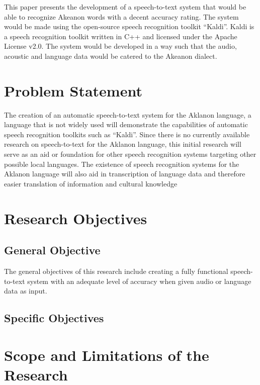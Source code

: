This paper presents the development of a speech-to-text system that would be able to recognize Akeanon words with a decent accuracy rating. The system would be made using the open-source speech recognition toolkit “Kaldi”. Kaldi is a speech recognition toolkit written in C++ and licensed under the Apache License v2.0. The system would be developed in a way such that the audio, acoustic and language data would be catered to the Akeanon dialect.


\section{Problem Statement}

The creation of an automatic speech-to-text system for the Aklanon language, a language that is not widely used will demonstrate the capabilities of automatic speech recognition toolkits such as “Kaldi”.  Since there is no currently available research on speech-to-text for the Aklanon language, this initial research will serve as an aid or foundation for other speech recognition systems targeting other possible local languages. The existence of speech recognition systems for the Aklanon language will also aid in transcription of language data and therefore easier translation of information and cultural knowledge

\section{Research Objectives}


\subsection{General Objective}

The general objectives of this research include creating a fully functional speech-to-text system with an adequate level of accuracy when given audio or language data as input. 


\subsection{Specific Objectives}



\section{Scope and Limitations of the Research}

